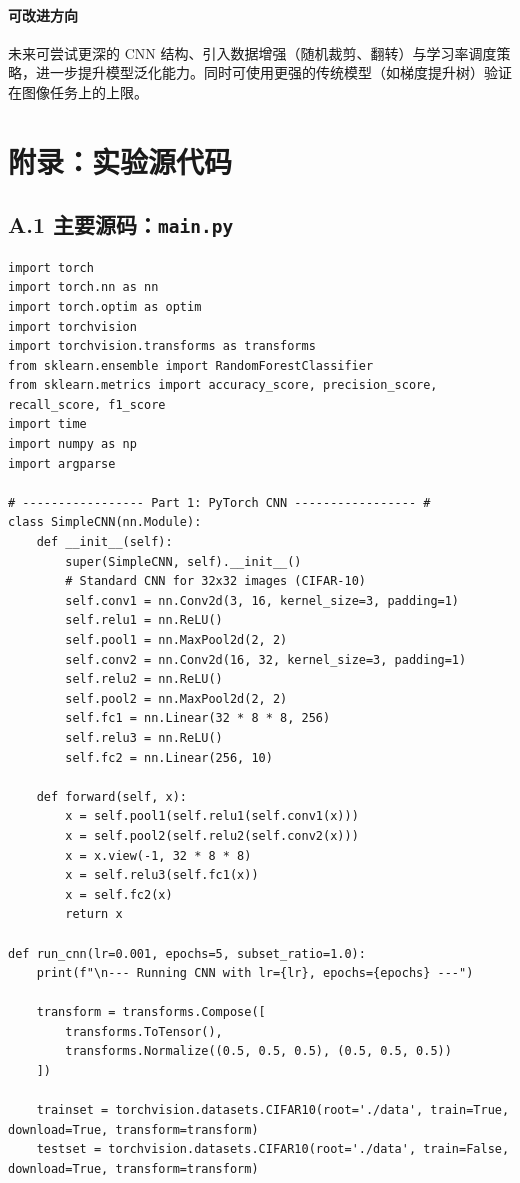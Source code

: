 \documentclass[runningheads]{ctexart}
\begin{document}
\paragraph{可改进方向}
未来可尝试更深的 CNN 结构、引入数据增强（随机裁剪、翻转）与学习率调度策略，进一步提升模型泛化能力。同时可使用更强的传统模型（如梯度提升树）验证在图像任务上的上限。

\section*{附录：实验源代码}
\subsection*{A.1 主要源码：\texttt{main.py}}
\begin{lstlisting}
import torch
import torch.nn as nn
import torch.optim as optim
import torchvision
import torchvision.transforms as transforms
from sklearn.ensemble import RandomForestClassifier
from sklearn.metrics import accuracy_score, precision_score, recall_score, f1_score
import time
import numpy as np
import argparse

# ----------------- Part 1: PyTorch CNN ----------------- #
class SimpleCNN(nn.Module):
    def __init__(self):
        super(SimpleCNN, self).__init__()
        # Standard CNN for 32x32 images (CIFAR-10)
        self.conv1 = nn.Conv2d(3, 16, kernel_size=3, padding=1)
        self.relu1 = nn.ReLU()
        self.pool1 = nn.MaxPool2d(2, 2)
        self.conv2 = nn.Conv2d(16, 32, kernel_size=3, padding=1)
        self.relu2 = nn.ReLU()
        self.pool2 = nn.MaxPool2d(2, 2)
        self.fc1 = nn.Linear(32 * 8 * 8, 256)
        self.relu3 = nn.ReLU()
        self.fc2 = nn.Linear(256, 10)

    def forward(self, x):
        x = self.pool1(self.relu1(self.conv1(x)))
        x = self.pool2(self.relu2(self.conv2(x)))
        x = x.view(-1, 32 * 8 * 8)
        x = self.relu3(self.fc1(x))
        x = self.fc2(x)
        return x

def run_cnn(lr=0.001, epochs=5, subset_ratio=1.0):
    print(f"\n--- Running CNN with lr={lr}, epochs={epochs} ---")
    
    transform = transforms.Compose([
        transforms.ToTensor(),
        transforms.Normalize((0.5, 0.5, 0.5), (0.5, 0.5, 0.5))
    ])

    trainset = torchvision.datasets.CIFAR10(root='./data', train=True, download=True, transform=transform)
    testset = torchvision.datasets.CIFAR10(root='./data', train=False, download=True, transform=transform)
    

\end{lstlisting}
\end{document}
